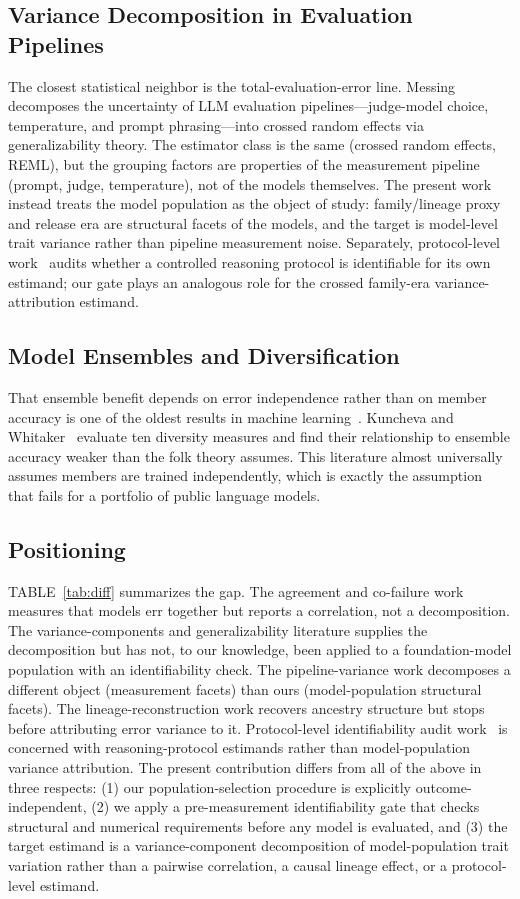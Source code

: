 \documentclass[11pt]{article}
\theoremstyle{definition}
\theoremstyle{plain}
\begin{document}
\subsection{Variance Decomposition in Evaluation Pipelines}
The closest statistical neighbor is the total-evaluation-error line. Messing~\cite{messing2026} decomposes the uncertainty of LLM evaluation pipelines---judge-model choice, temperature, and prompt phrasing---into crossed random effects via generalizability theory. The estimator class is the same (crossed random effects, REML), but the grouping factors are properties of the measurement pipeline (prompt, judge, temperature), not of the models themselves. The present work instead treats the model population as the object of study: family/lineage proxy and release era are structural facets of the models, and the target is model-level trait variance rather than pipeline measurement noise. Separately, protocol-level work~\cite{identaudit2026} audits whether a controlled reasoning protocol is identifiable for its own estimand; our gate plays an analogous role for the crossed family-era variance-attribution estimand.

\subsection{Model Ensembles and Diversification}
That ensemble benefit depends on error independence rather than on member accuracy is one of the oldest results in machine learning~\cite{dietterich2000,wolpert1992,breiman2001}. Kuncheva and Whitaker~\cite{kuncheva2003} evaluate ten diversity measures and find their relationship to ensemble accuracy weaker than the folk theory assumes. This literature almost universally assumes members are trained independently, which is exactly the assumption that fails for a portfolio of public language models.

\subsection{Positioning}
TABLE~\ref{tab:diff} summarizes the gap. The agreement and co-failure work measures that models err together but reports a correlation, not a decomposition. The variance-components and generalizability literature supplies the decomposition but has not, to our knowledge, been applied to a foundation-model population with an identifiability check. The pipeline-variance work decomposes a different object (measurement facets) than ours (model-population structural facets). The lineage-reconstruction work recovers ancestry structure but stops before attributing error variance to it. Protocol-level identifiability audit work~\cite{identaudit2026} is concerned with reasoning-protocol estimands rather than model-population variance attribution. The present contribution differs from all of the above in three respects: (1) our population-selection procedure is explicitly outcome-independent, (2) we apply a pre-measurement identifiability gate that checks structural and numerical requirements before any model is evaluated, and (3) the target estimand is a variance-component decomposition of model-population trait variation rather than a pairwise correlation, a causal lineage effect, or a protocol-level estimand.
\end{document}
